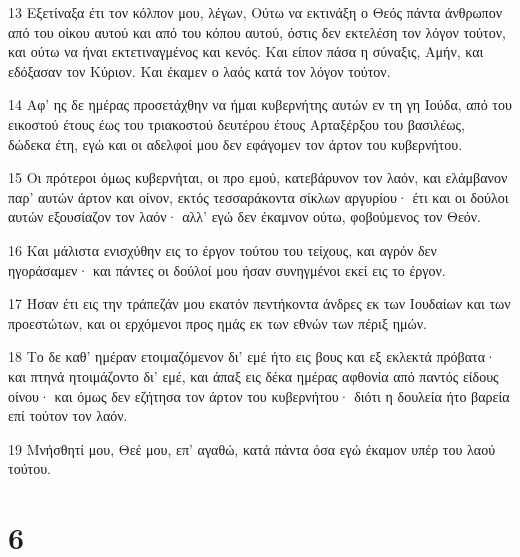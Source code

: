 \par 13 Εξετίναξα έτι τον κόλπον μου, λέγων, Ούτω να εκτινάξη ο Θεός πάντα άνθρωπον από του οίκου αυτού και από του κόπου αυτού, όστις δεν εκτελέση τον λόγον τούτον, και ούτω να ήναι εκτετιναγμένος και κενός. Και είπον πάσα η σύναξις, Αμήν, και εδόξασαν τον Κύριον. Και έκαμεν ο λαός κατά τον λόγον τούτον.
\par 14 Αφ' ης δε ημέρας προσετάχθην να ήμαι κυβερνήτης αυτών εν τη γη Ιούδα, από του εικοστού έτους έως του τριακοστού δευτέρου έτους Αρταξέρξου του βασιλέως, δώδεκα έτη, εγώ και οι αδελφοί μου δεν εφάγομεν τον άρτον του κυβερνήτου.
\par 15 Οι πρότεροι όμως κυβερνήται, οι προ εμού, κατεβάρυνον τον λαόν, και ελάμβανον παρ' αυτών άρτον και οίνον, εκτός τεσσαράκοντα σίκλων αργυρίου· έτι και οι δούλοι αυτών εξουσίαζον τον λαόν· αλλ' εγώ δεν έκαμνον ούτω, φοβούμενος τον Θεόν.
\par 16 Και μάλιστα ενισχύθην εις το έργον τούτου του τείχους, και αγρόν δεν ηγοράσαμεν· και πάντες οι δούλοί μου ήσαν συνηγμένοι εκεί εις το έργον.
\par 17 Ήσαν έτι εις την τράπεζάν μου εκατόν πεντήκοντα άνδρες εκ των Ιουδαίων και των προεστώτων, και οι ερχόμενοι προς ημάς εκ των εθνών των πέριξ ημών.
\par 18 Το δε καθ' ημέραν ετοιμαζόμενον δι' εμέ ήτο εις βους και εξ εκλεκτά πρόβατα· και πτηνά ητοιμάζοντο δι' εμέ, και άπαξ εις δέκα ημέρας αφθονία από παντός είδους οίνου· και όμως δεν εζήτησα τον άρτον του κυβερνήτου· διότι η δουλεία ήτο βαρεία επί τούτον τον λαόν.
\par 19 Μνήσθητί μου, Θεέ μου, επ' αγαθώ, κατά πάντα όσα εγώ έκαμον υπέρ του λαού τούτου.

\chapter{6}

